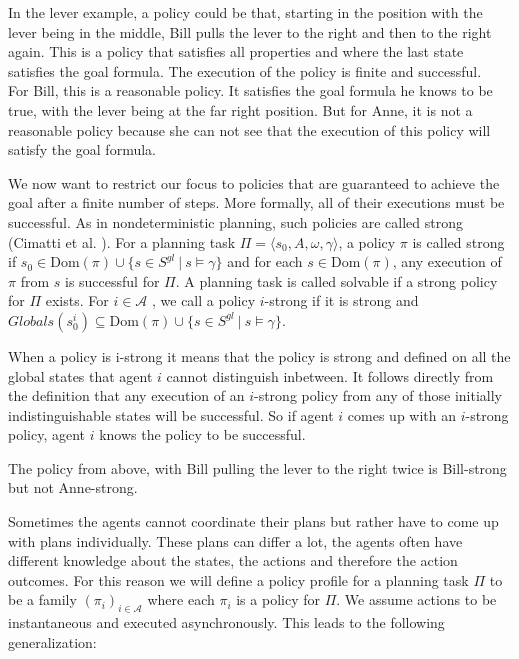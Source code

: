 
In the lever example, a policy could be that, starting in the position with the lever being in the middle, Bill pulls the lever to the right and then to the right again. This is a policy that satisfies all properties and where the last state satisfies the goal formula. The execution of the policy is finite and successful. \\
For Bill, this is a reasonable policy. It satisfies the goal formula he knows to be true, with the lever being at the far right position. But for Anne, it is not a reasonable policy because she can not see that the execution of this policy will satisfy the goal formula.

We now want to restrict our focus to policies that are guaranteed to achieve the goal after a finite number of steps. More formally, all of their executions must be successful. As in nondeterministic planning, such policies are called strong (Cimatti et al. \cite{cimattietal}).
For a planning task $\Pi = \langle s_0, A, \omega, \gamma \rangle$, a policy $\pi$ is called strong if $s_0 \in \text{Dom}(\pi) \cup \{s \in S^{gl} ~|~ s \models \gamma\}$ and for each $s \in \text{Dom}(\pi)$, any execution of $\pi$ from $s$ is successful for $\Pi$. A planning task is called solvable if a strong policy for $\Pi$ exists.
For $ i \in \mathcal{A} $ , we call a policy $i$-strong if it is strong and  $Globals(s_0^i ) \subseteq \text{Dom}(\pi) \cup\{ s \in S^{gl} ~|~ s \models \gamma \}$.

When a policy is i-strong it means that the policy is strong and defined on all the global states that agent $i$ cannot distinguish inbetween. It follows directly from the definition that any execution of an $i$-strong policy from any of those initially indistinguishable states will be successful. So if agent $i$ comes up with an $i$-strong policy, agent $i$ knows the policy to be successful.

The policy from above, with Bill pulling the lever to the right twice is Bill-strong but not Anne-strong.

Sometimes the agents cannot coordinate their plans but rather have to come up with plans individually. These plans can differ a lot, the agents often have different knowledge about the states, the actions and therefore the action outcomes. For this reason we will define a policy profile for a planning task $\Pi$ to be a family $(\pi_i)_{i \in \mathcal{A}}$ where each $\pi_i$ is a policy for $\Pi$. We assume actions to be instantaneous and executed asynchronously. This leads to the following generalization:

